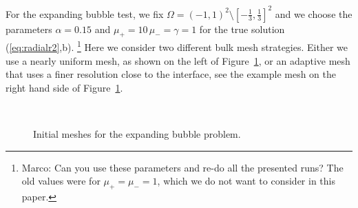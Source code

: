 \documentclass[a4paper,12pt,onecolumn]{article}
\begin{document}
For the expanding bubble test, we fix $\Omega = (-1,1)^2 \setminus [-\frac13,\frac13]^2$ and we choose the parameters
$\alpha = 0.15$ and $\mu_+ = 10\,\mu_- = \gamma = 1$
for the true solution (\ref{eq:radialr2},b). 
\footnote{Marco: Can you use these parameters and re-do all the presented runs?
The old values were for $\mu_+ = \mu_- = 1$, which we do not want to consider
in this paper.}
Here we consider two different bulk mesh strategies. Either we use a nearly
uniform mesh, as shown on the left of Figure~\ref{fig:meshes_expanding},
or an adaptive mesh that uses a finer resolution close to the interface,
see the example mesh on the right hand side of 
Figure~\ref{fig:meshes_expanding}.
\begin{figure}[htbp]
  \centering
  \quad
  \\
  \caption{Initial meshes for the expanding bubble problem.}
  \label{fig:meshes_expanding}
\end{figure}
\end{document}
